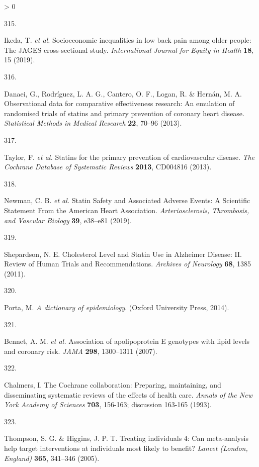 \documentclass[a4paper, twoside]{templates/ociamthesis}
\newlength{\cslhangindent}
\newlength{\csllabelwidth}
\newenvironment{CSLReferences}[3] %
 {%
  \setlength{\parindent}{0pt}
  \ifodd #1 \everypar{\setlength{\hangindent}{\cslhangindent}}\ignorespaces\fi
  \ifnum #2 > 0
  \setlength{\parskip}{#2\baselineskip}
  \fi
 }%
 {}
\newcommand{\CSLLeftMargin}[1]{\parbox[t]{\maxof{\widthof{#1}}{\csllabelwidth}}{#1}}
\newcommand{\CSLRightInline}[1]{\parbox[t]{\linewidth - \csllabelwidth}{#1}}
\begin{document}
\begin{CSLReferences}{0}{0}
\leavevmode\hypertarget{ref-ikeda2019}{}%
\CSLLeftMargin{315. }
\CSLRightInline{Ikeda, T. \emph{et al.} Socioeconomic inequalities in low back pain among older people: The {JAGES} cross-sectional study. \emph{International Journal for Equity in Health} \textbf{18}, 15 (2019).}

\leavevmode\hypertarget{ref-danaei2013}{}%
\CSLLeftMargin{316. }
\CSLRightInline{Danaei, G., Rodríguez, L. A. G., Cantero, O. F., Logan, R. \& Hernán, M. A. Observational data for comparative effectiveness research: An emulation of randomised trials of statins and primary prevention of coronary heart disease. \emph{Statistical Methods in Medical Research} \textbf{22}, 70--96 (2013).}

\leavevmode\hypertarget{ref-taylor2013}{}%
\CSLLeftMargin{317. }
\CSLRightInline{Taylor, F. \emph{et al.} Statins for the primary prevention of cardiovascular disease. \emph{The Cochrane Database of Systematic Reviews} \textbf{2013}, CD004816 (2013).}

\leavevmode\hypertarget{ref-newman2019}{}%
\CSLLeftMargin{318. }
\CSLRightInline{Newman, C. B. \emph{et al.} Statin {Safety} and {Associated Adverse Events}: A {Scientific Statement From} the {American Heart Association}. \emph{Arteriosclerosis, Thrombosis, and Vascular Biology} \textbf{39}, e38--e81 (2019).}

\leavevmode\hypertarget{ref-shepardson2011}{}%
\CSLLeftMargin{319. }
\CSLRightInline{Shepardson, N. E. Cholesterol {Level} and {Statin Use} in {Alzheimer Disease}: {II}. {Review} of {Human Trials} and {Recommendations}. \emph{Archives of Neurology} \textbf{68}, 1385 (2011).}

\leavevmode\hypertarget{ref-porta2014}{}%
\CSLLeftMargin{320. }
\CSLRightInline{Porta, M. \emph{A dictionary of epidemiology}. ({Oxford University Press}, 2014).}

\leavevmode\hypertarget{ref-bennet2007}{}%
\CSLLeftMargin{321. }
\CSLRightInline{Bennet, A. M. \emph{et al.} Association of apolipoprotein {E} genotypes with lipid levels and coronary risk. \emph{JAMA} \textbf{298}, 1300--1311 (2007).}

\leavevmode\hypertarget{ref-chalmers1993}{}%
\CSLLeftMargin{322. }
\CSLRightInline{Chalmers, I. The {Cochrane} collaboration: Preparing, maintaining, and disseminating systematic reviews of the effects of health care. \emph{Annals of the New York Academy of Sciences} \textbf{703}, 156-163; discussion 163-165 (1993).}

\leavevmode\hypertarget{ref-thompson2005}{}%
\CSLLeftMargin{323. }
\CSLRightInline{Thompson, S. G. \& Higgins, J. P. T. Treating individuals 4: Can meta-analysis help target interventions at individuals most likely to benefit? \emph{Lancet (London, England)} \textbf{365}, 341--346 (2005).}


\end{CSLReferences}
\end{document}
